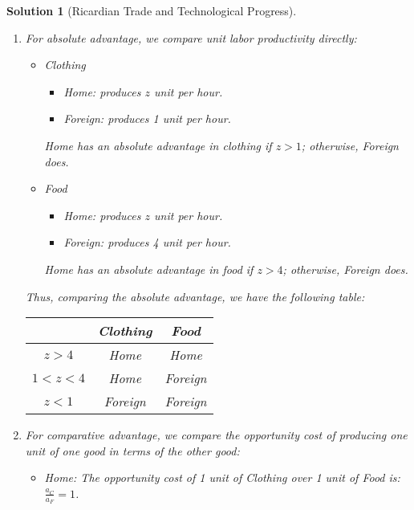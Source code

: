 \documentclass[a4paper,12pt]{article} %
\theoremstyle{nonitalic}
\newtheorem{solution}{Solution}
\begin{document}
\begin{solution}[Ricardian Trade and Technological Progress]
    \

    \begin{enumerate}
        \item[1.] For absolute advantage, we compare unit labor productivity directly:
            \begin{itemize}
                \item Clothing
                \begin{itemize}
                \item Home: produces $z$ unit per hour.
                \item Foreign: produces 1 unit per hour.
                \end{itemize}
                Home has an absolute advantage in clothing if $z>1$; otherwise, Foreign does.
                \item Food
                \begin{itemize}
                \item Home: produces $z$ unit per hour.
                \item Foreign: produces 4 unit per hour.
                \end{itemize}
                Home has an absolute advantage in food if $z>4$; otherwise, Foreign does.
            \end{itemize}
            Thus, comparing the absolute advantage, we have the following table:
            \begin{table}[H]
                \centering
                \begin{tabular}{c|c|c}
                \toprule
                & Clothing & Food \\
                \midrule
                $z>4$ & Home & Home \\
                $1<z<4$ & Home & Foreign \\
                $z<1$ & Foreign & Foreign \\
                \bottomrule
                \end{tabular}
            \end{table}
        \item[2.] For comparative advantage, we compare the opportunity cost of producing one unit of one good in terms of the other good:
            \begin{itemize}
                \item Home: The opportunity cost of 1 unit of Clothing over 1 unit of Food is: $\frac{a_C}{a_F} = 1$.

\end{itemize}
\end{enumerate}
\end{solution}
\end{document}
